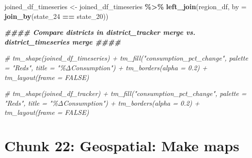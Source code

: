 \documentclass[
]{article}
\newenvironment{Shaded}{\begin{snugshade}}{\end{snugshade}}
\newcommand{\AttributeTok}[1]{\textcolor[rgb]{0.13,0.29,0.53}{#1}}
\newcommand{\CommentTok}[1]{\textcolor[rgb]{0.56,0.35,0.01}{\textit{#1}}}
\newcommand{\DocumentationTok}[1]{\textcolor[rgb]{0.56,0.35,0.01}{\textbf{\textit{#1}}}}
\newcommand{\FunctionTok}[1]{\textcolor[rgb]{0.13,0.29,0.53}{\textbf{#1}}}
\newcommand{\NormalTok}[1]{#1}
\newcommand{\OtherTok}[1]{\textcolor[rgb]{0.56,0.35,0.01}{#1}}
\newcommand{\SpecialCharTok}[1]{\textcolor[rgb]{0.81,0.36,0.00}{\textbf{#1}}}
\begin{document}
\begin{Shaded}
\begin{Highlighting}[]
\NormalTok{joined\_df\_timeseries }\OtherTok{\textless{}{-}}\NormalTok{ joined\_df\_timeseries }\SpecialCharTok{\%\textgreater{}\%}
  \FunctionTok{left\_join}\NormalTok{(region\_df, }\AttributeTok{by =} \FunctionTok{join\_by}\NormalTok{(state\_24 }\SpecialCharTok{==}\NormalTok{ state\_20))}



\DocumentationTok{\#\#\#\# Compare districts in district\_tracker merge vs. district\_timeseries merge \#\#\#\#}

\CommentTok{\# tm\_shape(joined\_df\_timeseries) + tm\_fill("consumption\_pct\_change", palette = "Reds", title = "\%ΔConsumption") + tm\_borders(alpha = 0.2) + tm\_layout(frame = FALSE)}

\CommentTok{\# tm\_shape(joined\_df\_tracker) + tm\_fill("consumption\_pct\_change", palette = "Reds", title = "\%ΔConsumption") + tm\_borders(alpha = 0.2) + tm\_layout(frame = FALSE)}
\end{Highlighting}
\end{Shaded}

\section*{Chunk 22: Geospatial: Make maps}\label{chunk-22-geospatial-make-maps}
\end{document}
